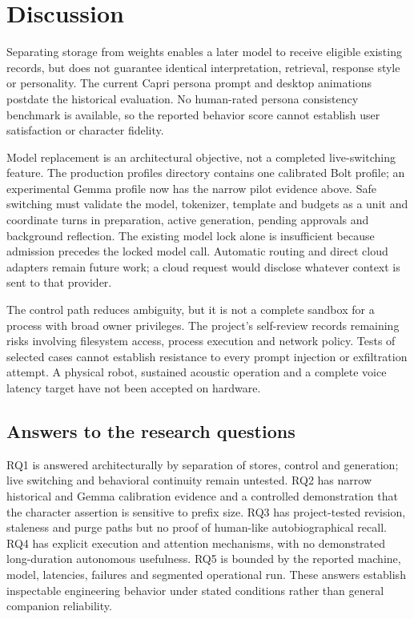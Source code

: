 \documentclass[11pt,a4paper]{article}
\begin{document}
\section{Discussion}
Separating storage from weights enables a later model to receive eligible existing records, but does not guarantee identical interpretation, retrieval, response style or personality. The current Capri persona prompt and desktop animations postdate the historical evaluation. No human-rated persona consistency benchmark is available, so the reported behavior score cannot establish user satisfaction or character fidelity.

Model replacement is an architectural objective, not a completed live-switching feature. The production profiles directory contains one calibrated Bolt profile; an experimental Gemma profile now has the narrow pilot evidence above. Safe switching must validate the model, tokenizer, template and budgets as a unit and coordinate turns in preparation, active generation, pending approvals and background reflection. The existing model lock alone is insufficient because admission precedes the locked model call. Automatic routing and direct cloud adapters remain future work; a cloud request would disclose whatever context is sent to that provider.

The control path reduces ambiguity, but it is not a complete sandbox for a process with broad owner privileges. The project's self-review records remaining risks involving filesystem access, process execution and network policy. Tests of selected cases cannot establish resistance to every prompt injection or exfiltration attempt. A physical robot, sustained acoustic operation and a complete voice latency target have not been accepted on hardware.


\subsection{Answers to the research questions}
RQ1 is answered architecturally by separation of stores, control and generation; live switching and behavioral continuity remain untested. RQ2 has narrow historical and Gemma calibration evidence and a controlled demonstration that the character assertion is sensitive to prefix size. RQ3 has project-tested revision, staleness and purge paths but no proof of human-like autobiographical recall. RQ4 has explicit execution and attention mechanisms, with no demonstrated long-duration autonomous usefulness. RQ5 is bounded by the reported machine, model, latencies, failures and segmented operational run. These answers establish inspectable engineering behavior under stated conditions rather than general companion reliability.
\end{document}
